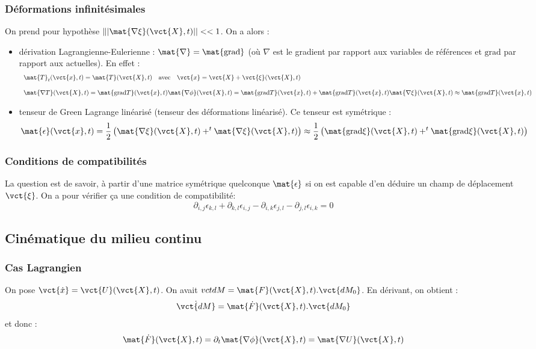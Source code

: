 \documentclass[11pt,a4paper]{article}
\begin{document}
\subsubsection{Déformations infinitésimales}
On prend pour hypothèse $\||\mat{\nabla\xi}(\vct{X},t)||<<1$. On a alors :
\begin{itemize}
	\item dérivation Lagrangienne-Eulerienne : $\mat{\nabla}=\mat{\textrm{grad}}$ (où $\nabla$ est le gradient par rapport aux variables de références et $\textrm{grad}$ par rapport aux actuelles). En effet :
	\[\begin{array}{l}
	\mat{T}_t(\vct{x},t)=\mat{T}(\vct{X},t)\quad\textrm{avec}\quad\vct{x}=\vct{X}+\vct{\xi}(\vct{X},t) \\
	\\
	\mat{\nabla T}(\vct{X},t)=\mat{\textrm{grad}T}(\vct{x},t)\mat{\nabla\phi}(\vct{X},t)=\mat{\textrm{grad}T}(\vct{x},t)+\mat{\textrm{grad}T}(\vct{x},t)\mat{\nabla\xi}(\vct{X},t)\approx\mat{\textrm{grad}T}(\vct{x},t)
	\end{array}
	\]
	\item tenseur de Green Lagrange linéarisé (tenseur des déformations linéarisé). Ce tenseur est symétrique : \[\mat{\epsilon}(\vct{x},t)=\frac{1}{2}\left(\mat{\nabla\xi}(\vct{X},t)+^t\mat{\nabla\xi}(\vct{X},t)\right)\approx\frac{1}{2}\left(\mat{\textrm{grad}\xi}(\vct{X},t)+^t\mat{\textrm{grad}\xi}(\vct{X},t)\right)\]
\end{itemize}

\subsubsection{Conditions de compatibilités}
La question est de savoir, à partir d'une matrice symétrique quelconque $\mat{\epsilon}$ si on est capable d'en déduire un champ de déplacement $\vct{\xi}$. On a pour vérifier ça une condition de compatibilité:
\begin{equation*}
\partial_{i,j}\epsilon_{k,l}+\partial_{k,l}\epsilon_{i,j}-\partial_{i,k}\epsilon_{j,l}-\partial_{j,l}\epsilon_{i,k}=0
\end{equation*}


\subsection{Cinématique du milieu continu}
\subsubsection{Cas Lagrangien}
On pose $\vct{\dot{x}}=\vct{U}(\vct{X},t)$. On avait $vct{dM}=\mat{F}(\vct{X},t).\vct{dM_0}$. En dérivant, on obtient :
\[\dot{\vct{dM}}=\mat{\dot{F}}(\vct{X},t).\vct{dM_0}\] et donc :
\[\mat{\dot{F}}(\vct{X},t)=\partial_t\mat{\nabla\phi}(\vct{X},t)=\mat{\nabla U}(\vct{X},t)\]
\end{document}
